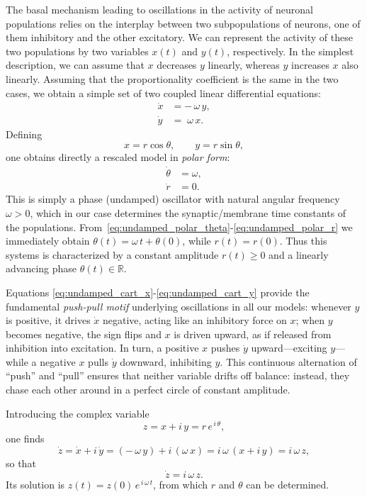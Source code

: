\documentclass[12pt]{article}
\numberwithin{equation}{section}
\begin{document}
The basal mechanism leading to oscillations in the activity of neuronal populations relies on the interplay between two subpopulations of neurons, one of them inhibitory and the other excitatory.
We can represent the activity of these two populations by two variables $x(t)$ and $y(t)$, respectively.
In the simplest description, we can assume that $x$ decreases $y$ linearly, whereas $y$ increases $x$ also linearly.
Assuming that the proportionality coefficient is the same in the two cases, we obtain a simple set of two coupled linear differential equations:
\begin{align}
    \dot{x} &= -\,\omega\,y,
    \label{eq:undamped_cart_x}\\
    \dot{y} &= \;\omega\,x.
    \label{eq:undamped_cart_y}
\end{align}
Defining
\begin{equation}
    x = r \cos\theta,\qquad
    y = r \sin\theta,
    \label{eq:undamped_xy_def}
\end{equation}
one obtains directly a rescaled model in \textit{polar form}:
\begin{align}
    \dot{\theta} &= \omega, 
    \label{eq:undamped_polar_theta}\\
    \dot{r}      &= 0.
    \label{eq:undamped_polar_r}
\end{align}
This is simply a phase (undamped) oscillator with natural angular frequency $\omega>0$, which in our case determines the synaptic/membrane time constants of the populations.
From~\eqref{eq:undamped_polar_theta}-\eqref{eq:undamped_polar_r} we immediately obtain $\theta(t) = \omega\,t + \theta(0)$, while $r(t) = r(0)$. Thus this systems is characterized by a constant amplitude $r(t)\ge0$ and a linearly advancing phase
$\theta(t)\in\mathbb{R}$.  

  Equations \eqref{eq:undamped_cart_x}-\eqref{eq:undamped_cart_y} provide the fundamental \textit{push-pull motif} underlying oscillations in all our models: whenever \(y\) is positive, it drives \(\dot{x}\) negative, acting like an inhibitory force on \(x\); when \(y\) becomes negative, the sign flips and \(x\) is driven upward, as if released from inhibition into excitation.  In turn, a positive \(x\) pushes \(\dot{y}\) upward—exciting \(y\)—while a negative \(x\) pulls \(\dot{y}\) downward, inhibiting \(y\).  This continuous alternation of “push” and “pull” ensures that neither variable drifts off balance: instead, they chase each other around in a perfect circle of constant amplitude.

Introducing the complex variable
\begin{equation}
    z = x + i\,y = r\,e^{\,i\,\theta},
    \label{eq:undamped_complex_z}
\end{equation}
one finds
\begin{equation}
    \dot{z} = \dot{x} + i\,\dot{y}
            = (-\,\omega\,y) + i\,(\omega\,x)
            = i\,\omega\,(x + i\,y)
            = i\,\omega\,z,    
\end{equation}
so that
\begin{equation}
    \dot{z} = i\,\omega\,z.
    \label{eq:undamped_complex}
\end{equation}
Its solution is $z(t) = z(0)\,e^{\,i\,\omega\,t}$, from which $r$ and $\theta$ can be determined.
\end{document}
